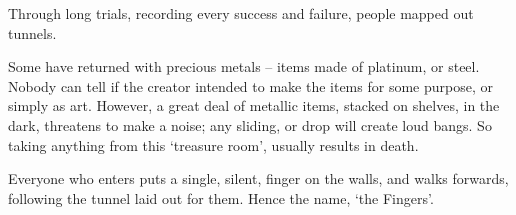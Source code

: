 \begin{multicols}{2}
Through long trials, recording every success and failure, people mapped out tunnels.

Some have returned with precious metals -- items made of platinum, or steel.
Nobody can tell if the creator intended to make the items for some purpose, or simply as art.
However, a great deal of metallic items, stacked on shelves, in the dark, threatens to make a noise; any sliding, or drop will create loud bangs.
So taking anything from this `treasure room', usually results in death.

Everyone who enters puts a single, silent, finger on the walls, and walks forwards, following the tunnel laid out for them.
Hence the name, `the Fingers'.

\end{multicols}


\printindex[history]

\label{talismanIndex}
\printindex[talismans]

\printindex[spells]

\printindex

